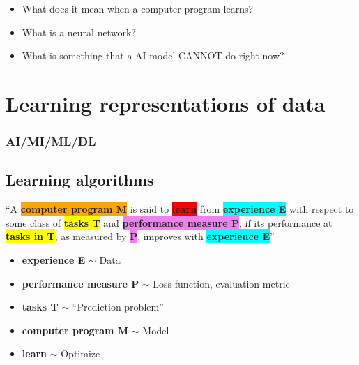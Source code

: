 \begin{summary}
    \begin{itemize}
        \item What does it mean when a computer program learns?
        \item What is a neural network?
        \item What is something that a AI model CANNOT do right now?
    \end{itemize}
\end{summary}

\section{Learning representations of data}
\subsubsection{AI/MI/ML/DL}
\begin{definition}
\end{definition}
\subsection{Learning algorithms}
\begin{definition}
    \textquotedblleft A \colorbox{orange}{\textbf{computer program M}} is said to \colorbox{red}{\textbf{learn}} from \colorbox{cyan}{\textbf{experience E}} with respect to some class of \colorbox{yellow}{\textbf{tasks T}} and \colorbox{violet}{\textbf{performance measure P}}, if its performance at \colorbox{yellow}{\textbf{tasks in T}}, as measured by \colorbox{violet}{\textbf{P}}, improves with \colorbox{cyan}{\textbf{experience E}}\textquotedblright
    \vspace{1em}

    \begin{itemize}
        \item \textbf{\color{cyan}experience E} $\sim$ Data
        \item \textbf{\color{violet}performance measure P} $\sim$ Loss function, evaluation metric
        \item \textbf{\color{yellow}tasks T} $\sim$ ``Prediction problem''
        \item \textbf{\color{orange}computer program M} $\sim$ Model
        \item \textbf{\color{red}learn} $\sim$ Optimize
    \end{itemize}
\end{definition}

